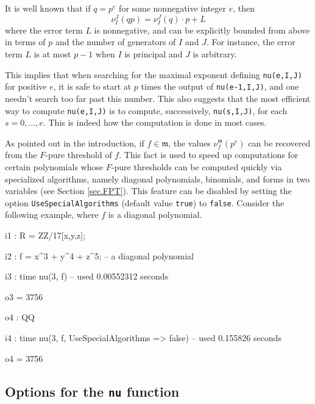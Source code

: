 \documentclass{amsart}
\begin{document}

It is well known that if $q=p^e$ for some nonnegative integer $e$, then \[ \nu_I^J(qp) = \nu_I^J(q)\cdot p + L\]  where the error term $L$ is nonnegative, and can be explicitly bounded from above in terms of $p$ and the number of generators of $I$ and $J$.  For instance, the error term $L$ is at most $p-1$ when $I$ is principal and $J$ is arbitrary.

This implies that when searching for the maximal exponent defining {\tt nu(e,I,J)} for positive $e$, it is safe to start at $p$ times the output of {\tt nu(e-1,I,J)}, and one needn't search too far past this number.  This also suggests that the most efficient way to compute {\tt nu(e,I,J)} is to compute, successively, {\tt nu(s,I,J)}, for each $s = 0,\ldots,e$.  This is indeed how the computation is done in most cases.

As pointed out in the introduction, if $f \in \mathfrak{m}$, the values $\nu^{\mathfrak{m}}_f(p^e)$ can be recovered from the $F$-pure threshold of $f$.
This fact is used to speed up computations for certain polynomials whose $F$-pure thresholds can be computed quickly via specialized algorithms, namely diagonal polynomials, binomials, and forms in two variables (see Section \ref{sec.FPT}).  This feature can be disabled by setting the option {\tt UseSpecialAlgorithms} (default value {\tt true}) to {\tt false}.  Consider the following example, where $f$ is a diagonal polynomial.

{\small
{}
\begin{MyVerbatim}

i1 : R = ZZ/17[x,y,z];

i2 : f = x^3 + y^4 + z^5; -- a diagonal polynomial

i3 : time nu(3, f)
     -- used 0.00552312 seconds

o3 = 3756

o4 : QQ

i4 : time nu(3, f, UseSpecialAlgorithms => false)
     -- used 0.155826 seconds

o4 = 3756
\end{MyVerbatim}
}
\medspace



\subsection*{Options for the {\tt nu} function}
\end{document}
